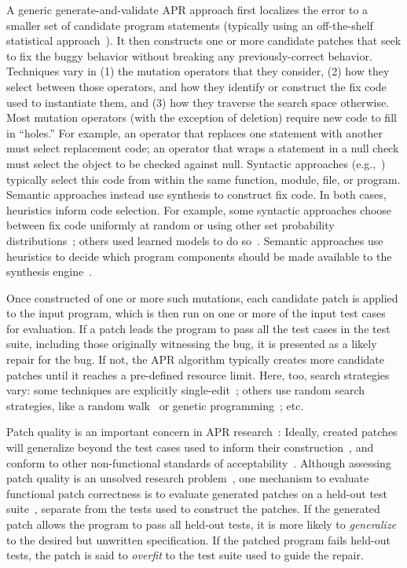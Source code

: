 \documentclass[conference]{IEEEtran}
\begin{document}
A generic generate-and-validate APR approach first
localizes the error to a smaller set of
candidate program statements (typically using an off-the-shelf statistical approach~\cite{Jones02}).  It
then constructs one or more candidate patches that seek to fix the buggy
behavior without breaking any previously-correct behavior.  
Techniques vary in (1) the mutation operators that they consider, (2) how they select
between those operators, and how they identify or
construct the fix code used to instantiate them, and (3) how they traverse
the search space otherwise.  
Most mutation operators (with the exception of deletion) require new code to
fill in ``holes.''  For example, an operator that replaces one statement with
another must select replacement code; an operator that wraps a statement
in a null check must select the object to be checked against null.
Syntactic approaches (e.g.,~\cite{legoues12Genprog,long16proph,kim2013,xuan16}) typically select this code from within the
same function, module, file, or program.  Semantic approaches instead use synthesis to
construct fix code.  
In both cases, heuristics inform code selection.  For example, some syntactic approaches
choose between fix code uniformly at random or using other set probability distributions~\cite{kim2013,legoues12Genprog}; others used learned
models to do so~\cite{long16proph}.  Semantic approaches use heuristics to
decide which program components should be made available to the synthesis
engine~\cite{Mechtaev2016,xuanNopol}. 

Once constructed of one or more such mutations, each candidate patch is
applied to the input program, which is then run on
one or more of the input test cases for evaluation.  If a patch leads the
program to 
pass all the test cases in the test suite, including those originally witnessing
the bug, it is presented as a likely repair for the bug. 
If not, the APR algorithm typically creates more candidate patches 
until it reaches a pre-defined resource limit. 
Here, too, search strategies vary: some techniques 
are explicitly single-edit~\cite{Qi13TrpAutoR,Weimer13,xuanNopol}; others use
random search strategies, like a random walk~\cite{debroy10} or genetic
programming~\cite{kim2013,legoues12,xuan16}; etc. 

Patch quality is an important concern in APR research~\cite{Qi15}: Ideally,
created patches will generalize beyond the test cases used to inform their
construction~\cite{smith15}, and conform to other non-functional standards of
acceptability~\cite{fry2010,kim2013}.  Although assessing patch quality is an
unsolved research problem~\cite{monperrus14critical}, one mechanism to evaluate functional patch
correctness is to evaluate generated patches on a held-out test suite~\cite{smith15,legoues12Genprog}, separate
from the tests used to construct the patches. 
If the generated patch allows the program to pass all held-out tests, it is more likely to
\emph{generalize} to the desired but unwritten specification. If the patched
program fails held-out tests, the patch is said to \emph{overfit} to 
the test suite used to guide the repair. 
\end{document}
